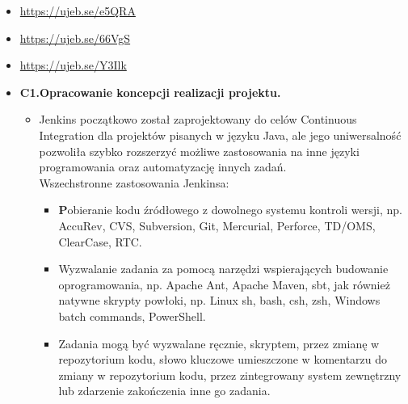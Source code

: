 \documentclass[12pt]{article}
\renewcommand{\_}{\kern-1.5pt\textunderscore\kern-1.5pt}
\begin{document}
\begin{itemize}
\begin{itemize}
\begin{itemize}
	\item \href{https://ujeb.se/e5QRA}{https://ujeb.se/e5QRA}\par

	\item \href{https://ujeb.se/66VgS}{https://ujeb.se/66VgS}\par

	\item \href{https://ujeb.se/Y3Ilk}{https://ujeb.se/Y3Ilk} \\

\end{itemize}
\end{itemize}
\end{itemize}\par

\begin{itemize}
	\item \textbf{C1.Opracowanie koncepcji realizacji projektu.}\par

\begin{itemize}
	\item Jenkins początkowo został zaprojektowany do celów Continuous Integration dla projektów pisanych w języku Java, ale jego uniwersalność pozwoliła szybko rozszerzyć możliwe zastosowania na inne języki programowania oraz automatyzację innych zadań.\\
Wszechstronne zastosowania Jenkinsa:\par

\begin{itemize}
	\item \textbf{P}obieranie kodu źródłowego z dowolnego systemu kontroli wersji, np.  AccuRev, CVS, Subversion, Git, Mercurial, Perforce, TD/OMS, ClearCase, RTC.\par

	\item Wyzwalanie zadania za pomocą narzędzi wspierających budowanie oprogramowania, np. Apache Ant, Apache Maven, sbt, jak również natywne skrypty powłoki, np. Linux sh, bash, csh, zsh, Windows batch commands, PowerShell.\par

	\item Zadania mogą być wyzwalane ręcznie, skryptem, przez zmianę w repozytorium kodu, słowo kluczowe umieszczone w komentarzu do zmiany w repozytorium kodu, przez zintegrowany system zewnętrzny lub zdarzenie zakończenia inne go zadania.\par


\end{itemize}
\end{itemize}
\end{itemize}
\end{document}
